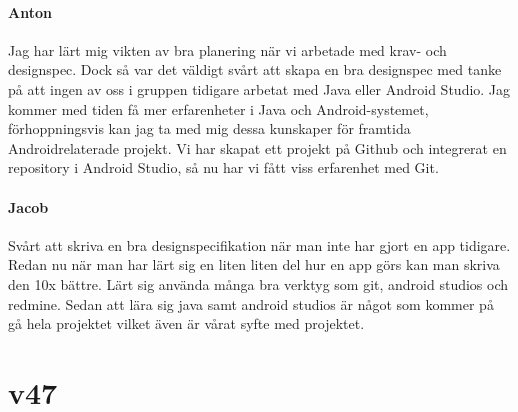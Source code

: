 \documentclass{article}
\begin{document}
\paragraph{Anton}
Jag har lärt mig vikten av bra planering när vi arbetade med krav- och designspec. Dock så var det väldigt svårt att skapa en bra designspec med tanke på att ingen av oss i gruppen tidigare arbetat med Java eller Android Studio. Jag kommer med tiden få mer erfarenheter i Java och Android-systemet, förhoppningsvis kan jag ta med mig dessa kunskaper för framtida Androidrelaterade projekt.
Vi har skapat ett projekt på Github och integrerat en repository i Android Studio, så nu har vi fått viss erfarenhet med Git.

\paragraph{Jacob}
Svårt att skriva en bra designspecifikation när man inte har gjort en app tidigare.
Redan nu när man har lärt sig en liten liten del hur en app görs kan man skriva den 10x bättre. 
Lärt sig använda många bra verktyg som git, android studios och redmine.
Sedan att lära sig java samt android studios är något som kommer på gå hela projektet vilket även är vårat syfte med projektet.


\newpage{}
\section*{v47}
\end{document}
